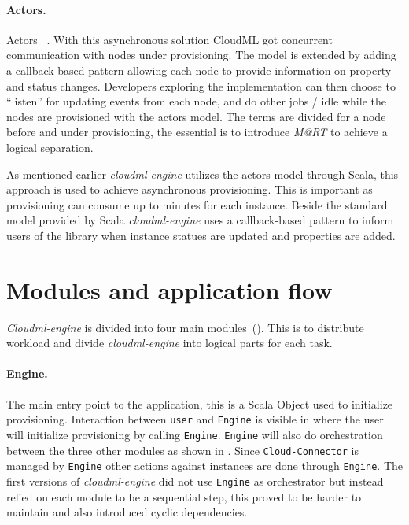 \paragraph{Actors.}

Actors ~\cite{actors:haller07}.
With this asynchronous solution CloudML got concurrent communication with nodes under provisioning.
The model is extended by adding a callback-based pattern allowing each node to provide 
information on property and status changes.
Developers exploring the implementation can then choose to ``listen'' for updating events from each node,
and do other jobs / idle while the nodes are provisioned with the actors model.
The terms are divided for a node before and under provisioning, the essential is to introduce 
\emph{M@RT} to achieve a logical separation.

\hr

As mentioned earlier \emph{cloudml-engine} utilizes the actors model through Scala,
this approach is used to achieve asynchronous provisioning.
This is important as provisioning can consume up to minutes for each instance.
Beside the standard model provided by Scala \emph{cloudml-engine} uses
a callback-based pattern to inform users of the library when instance statues
are updated and properties are added.

\section{Modules and application flow}




\emph{Cloudml-engine} is divided into four main modules~().
This is to distribute workload and divide \emph{cloudml-engine} into logical parts for each task.

\paragraph{Engine.} 



The main entry point to the application, this is a Scala Object used to initialize provisioning.
Interaction between \texttt{user} and \texttt{Engine} is visible in  
where the user will initialize provisioning by calling \texttt{Engine}.
\texttt{Engine} will also do orchestration between the three other modules
as shown in .
Since \texttt{Cloud-Connector} is managed by \texttt{Engine} other actions against 
instances are done through \texttt{Engine}.
The first versions of \emph{cloudml-engine} did not use \texttt{Engine} as orchestrator but
instead relied on each module to be a sequential step, this proved to be harder to maintain
and also introduced cyclic dependencies.

